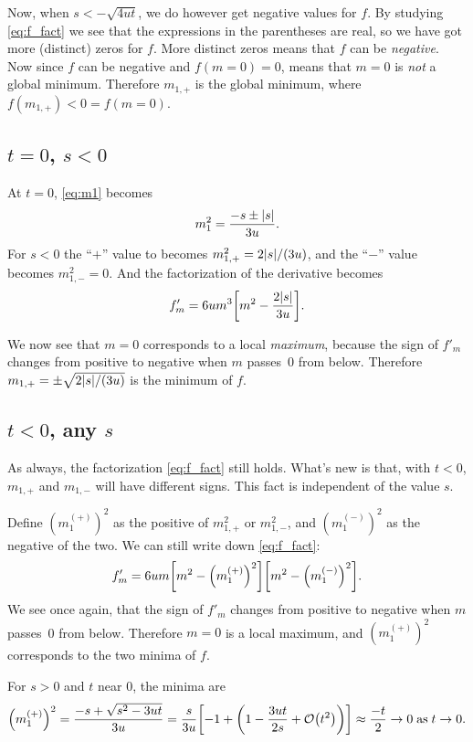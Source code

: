 \documentclass[11pt,letter, swedish, english
]{article}
\begin{document}
Now, when $s<-\sqrt{4ut}$, we do however get negative values
for $f$. By studying \eqref{eq:f_fact} we see that the expressions in
the parentheses are real, so we have got more (distinct) zeros for
$f$. More distinct zeros means that $f$ can be \emph{negative}. Now since
$f$ can be negative and $f(m=0)=0$, means that $m=0$ is \emph{not} a global
minimum. Therefore $m_{1,+}$ is the global minimum\footnotemark{}, where
$f(m_{1,+})<0=f(m=0)$. 


\subsection{$t=0$, $s<0$}
At $t=0$, \eqref{eq:m1} becomes
\begin{equation}\label{eq:m1_t=0}
m_1^2=\frac{-s\pm\abs{s}}{3u}.
\end{equation}
For $s<0$ the ``$+$'' value to becomes $m_{1,+}^2=2\abs{s}/(3u)$, and
the ``$-$'' value becomes $m_{1,-}^2=0$. And the factorization of the
derivative becomes
\begin{equation}%
f'_m=6um^3\qty[m^2-\frac{2\abs{s}}{3u}].
\end{equation}

We now see that $m=0$ corresponds to a local \emph{maximum}, because
the sign of $f'_m$ changes from positive to negative when $m$ passes~0
from below. Therefore $m_{1,+}=\pm\sqrt{2\abs{s}/(3u)}$ is the minimum
of $f$. 

\subsection{$t<0$, any $s$}
As always, the factorization \eqref{eq:f_fact} still holds. What's new
is that, with $t<0$, $m_{1,+}$ and $m_{1,-}$ will have different
signs. This fact is independent of the value $s$. 

Define $(m_1^{(+)})^2$ as the positive of $m_{1,+}^2$ or $m_{1,-}^2$, and
$(m_1^{(-)})^2$ as the negative of the two. We can still write down
\eqref{eq:f_fact}:
\begin{equation}\label{eq:f'_fact}
f'_m=6um\qty[m^2-\qty(m_{1}^{(+)})^2]\qty[m^2-\qty(m_{1}^{(-)})^2].
\end{equation}
We see once again, that the sign of $f'_m$ changes from positive to
negative when $m$ passes~0 from below. Therefore $m=0$ is a local
maximum, and $(m_{1}^{(+)})^2$ corresponds to the two minima of $f$.

For $s>0$ and $t$ near 0, the minima are
\begin{equation}
\qty(m_{1}^{(+)})^2=\frac{-s+\sqrt{s^2-3ut}}{3u}
=\frac{s}{3u}\qty[-1+\qty(1-\frac{3ut}{2s}+\order{t^2})]
\approx \frac{-t}{2}\to0\;\text{as}\;t\to0.
\end{equation}
\end{document}

